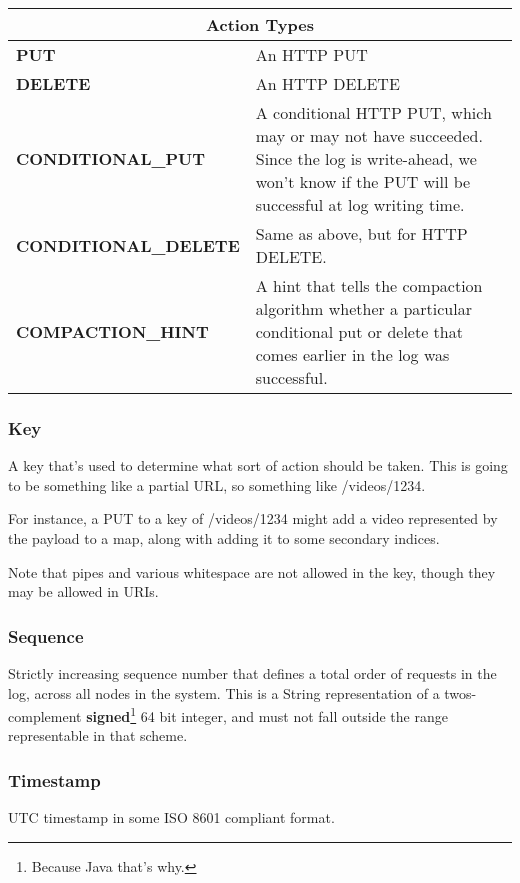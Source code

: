 \begin{center}
\begin{tabular}{|l|p{3.5in}|}
\hline
\multicolumn{2}{|c|}{Action  Types}\\ \hline
\textbf{PUT} & An HTTP PUT\\ \hline
\textbf{DELETE} & An HTTP DELETE\\ \hline
\textbf{CONDITIONAL\_PUT} & A conditional HTTP PUT, which may or may not have succeeded.   Since the log is write-ahead, we won’t know if the PUT will be successful at log writing time.\\ \hline
\textbf{CONDITIONAL\_DELETE} & Same as above, but for HTTP DELETE.\\ \hline
\textbf{COMPACTION\_HINT} & A hint that tells the compaction algorithm whether a particular conditional put or delete that comes earlier in the log was successful.\\ \hline
\end{tabular}
\end{center}

\subsubsection{Key}
A key that’s used to determine what sort of action should be taken.  This is going to be something like a partial URL, so something like /videos/1234.

For instance, a PUT to a key of /videos/1234 might add a video represented by the payload to a map, along with adding it to some secondary indices.  

Note that pipes and various whitespace are not allowed in the key, though they may be allowed in URIs.

\subsubsection{Sequence}
Strictly increasing sequence number that defines a total order of requests in the log, across all nodes in the system.  This is a String representation of a twos-complement \textbf{signed}\footnote{Because Java that’s why.} 64 bit integer, and must not fall outside the range representable in that scheme.

\subsubsection{Timestamp}
UTC timestamp in some ISO 8601 compliant format.


